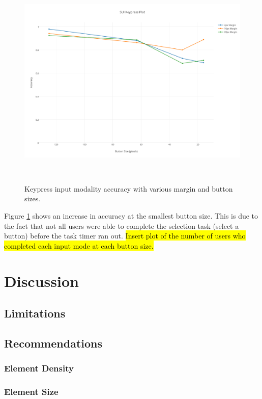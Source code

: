 \documentclass{sigchi}
\begin{document}
\begin{figure}
\centering
  \includegraphics[width=0.9\columnwidth]{figures/keypress-accuracy.pdf}
  \caption{Keypress input modality accuracy with various margin and button sizes.
  }~\label{fig:keypress-accuracy}
\end{figure}

Figure \ref{fig:keypress-accuracy} shows an increase in accuracy at the
smallest button size. This is due to the fact that not all users were able
to complete the selection task (select a button) before the task timer ran
out. \hl{Insert plot of the number of users who completed each input mode at
each button size.}

\section{Discussion}


\subsection{Limitations}


\subsection{Recommendations}

\subsubsection{Element Density}

\subsubsection{Element Size}
\end{document}

